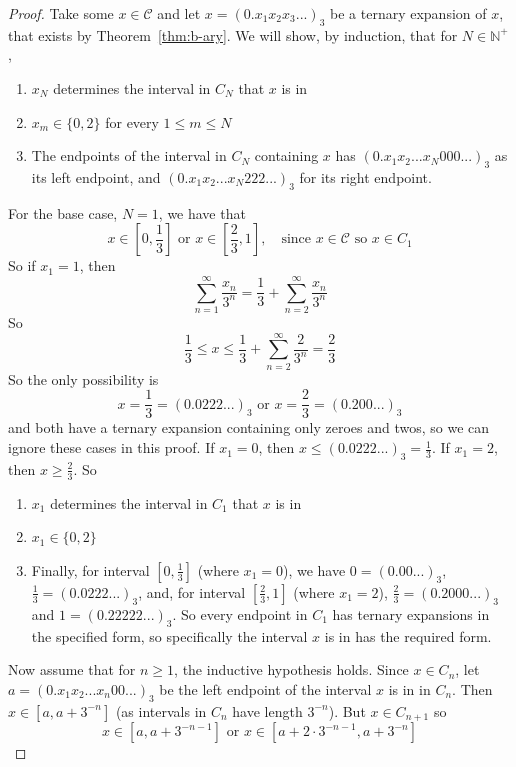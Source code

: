 \documentclass{article}
\theoremstyle{plain}
\theoremstyle{definition}
\theoremstyle{remark}
\begin{document}
\begin{proof}
Take some $x \in \mathcal{C}$ and let $x = (0.x_1x_2x_3...)_3$ be a ternary expansion of $x$, that exists by Theorem~\ref{thm:b-ary}. We will show, by induction, that for $N \in \mathbb{N}^+$, 
    \begin{enumerate}
        \item $x_N$ determines the interval in $C_N$ that $x$ is in
        \item $x_m \in \{0,2\}$ for every $1 \le m \le N$
        \item The endpoints of the interval in $C_N$ containing $x$ has $(0.x_1x_2...x_N000...)_3$ as its left endpoint, and $(0.x_1x_2...x_N222...)_3$ for its right endpoint.
    \end{enumerate}
    For the base case, $N=1$, we have that \[
    x \in \left [ 0, \frac{1}{3}\right] \text{ or } x \in \left [ \frac{2}{3}, 1\right ], \quad \text{since } x \in \mathcal{C} \text{  so  } x \in C_1
    \]
So if $x_1 = 1$, then \[
  \sum \limits _{n=1}^{\infty } \frac{x_n}{3^n}  = \frac{1}{3} +  \sum \limits _{n=2}^{\infty } \frac{x_n}{3^n} 
\]
So \[
\frac{1}{3} \le x \le \frac{1}{3} + \sum \limits _{n=2}^\infty \frac{2}{3^n} = \frac{2}{3}
\]
So the only possibility is \[
x = \frac{1}{3} = (0.0222...)_3 \text{ or } x = \frac{2}{3} = (0.200...)_3
\]
and both have a ternary expansion containing only zeroes and twos, so we can ignore these cases in this proof. If $x_1 = 0 $, then $x \le (0.0222...)_3 = \frac{1}{3}$. If $x_1 = 2$, then $x \ge \frac{2}{3}$. So
\begin{enumerate}
    \item $x_1$ determines the interval in $C_1$ that $x$ is in
    \item $x_1 \in \{0,2\}$
    \item Finally, for interval $ \left[0, \frac{1}{3} \right ]$ (where $x_1 = 0$), we have $0 = (0.00...)_3$, $\frac{1}{3} = (0.0222...)_3$, and, for interval $\left [ \frac{2}{3}, 1\right ]$ (where $x_1 = 2$), $\frac{2}{3} = (0.2000...)_3$ and $1 = (0.22222...)_3$. So every endpoint in $C_1$ has ternary expansions in the specified form, so specifically the interval $x$ is in has the required form.
\end{enumerate}
Now assume that for $n \ge 1$, the inductive hypothesis holds. 
Since $x \in C_n$, let $a = (0.x_1x_2...x_n00...)_3$ be the left endpoint of the interval $x$ is in in $C_n$. Then $ x  \in \left [a, a+3^{-n} \right ] $ (as intervals in $C_n$ have length $3^{-n}$). But $x \in C_{n+1}$ so \[
x \in \left [a, a+3^{-n-1} \right ] \text{ or } x \in \left [ a + 2 \cdot 3^{-n-1}, a + 3^{-n}\right ]
\]
\end{proof}
\end{document}
